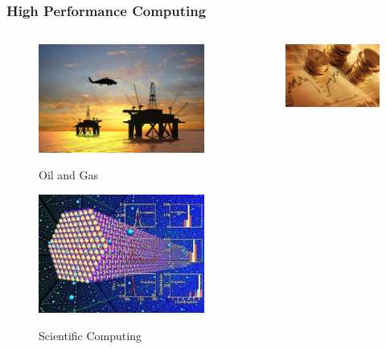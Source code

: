 \begin{frame}
  \frametitle{High Performance Computing}
  \begin{columns}
    \begin{center}
      \begin{figure}
        \includegraphics[scale=0.2]{figs/oil-gas-industry.jpg}\\
        \caption{Oil and Gas}
      \end{figure}
      \vspace{-0.5cm}
      \begin{figure}
        \includegraphics[scale=0.3]{figs/scientific-computing.jpg}\\
        \caption{Scientific Computing}
      \end{figure}
    \end{center}
    \begin{center}
      \begin{figure}
        \includegraphics[scale=0.31]{figs/finance.jpg}\\

\end{figure}
\end{center}
\end{columns}
\end{frame}
